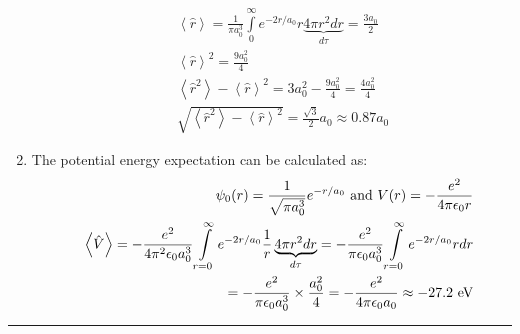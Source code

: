 \begin{enumerate}
\begin{eqnarray}
\nonumber
& & \left<\hat{r}\right> = \frac{1}{\pi a_0^3}\int\limits_{0}^{\infty}e^{-2r/a_0}r\underbrace{4\pi r^2 dr}_{d\tau} = \frac{3a_0}{2}\\
\nonumber
& & \left<\hat{r}\right>^2 = \frac{9a_0^2}{4}\\
\nonumber
& & \left<\hat{r}^2\right> - \left<\hat{r}\right>^2 = 3a_0^2 - \frac{9a_0^2}{4} = \frac{4a_0^2}{4}\\
\nonumber
& & \sqrt{\left<\hat{r}^2\right> - \left<\hat{r}\right>^2} = \frac{\sqrt{3}}{2}a_0\approx 0.87a_0
\end{eqnarray}
\item The potential energy expectation can be calculated as:
\begin{eqnarray}
\nonumber
& & \psi_0(r) = \frac{1}{\sqrt{\pi a_0^3}}e^{-r/a_0}\textnormal{ and }V(r) = -\frac{e^2}{4\pi\epsilon_0r}\\
\nonumber
& & \left<\hat{V}\right> = -\frac{e^2}{4\pi^2\epsilon_0a_0^3}\int\limits_{r=0}^{\infty}e^{-2r/a_0}\frac{1}{r}\underbrace{4\pi r^2dr}_{d\tau} = -\frac{e^2}{\pi\epsilon_0a_0^3}\int\limits_{r=0}^{\infty}e^{-2r/a_0}rdr\\
\nonumber
& & = -\frac{e^2}{\pi\epsilon_0a_0^3}\times\frac{a_0^2}{4} = -\frac{e^2}{4\pi\epsilon_0a_0}\approx -27.2\textnormal{ eV}
\end{eqnarray}
\end{enumerate}

\hrule\vspace{0.5cm}
